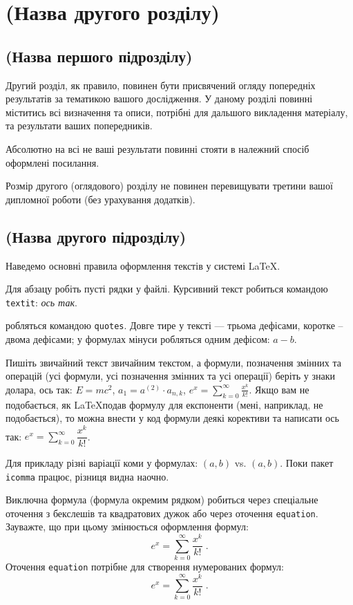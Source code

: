 
\chapter{(Назва другого розділу)}
\label{chap:review}

\section{(Назва першого підрозділу)}

Другий розділ, як правило, повинен бути присвячений огляду попередніх результатів за 
тематикою вашого дослідження. У даному розділі повинні міститись всі 
визначення та описи, потрібні для дальшого викладення матеріалу, та результати 
ваших попередників.

Абсолютно на всі не ваші результати повинні стояти 
в належний спосіб оформлені посилання.

Розмір другого (оглядового) розділу не повинен перевищувати третини вашої 
дипломної роботи (без урахування додатків).


\section{(Назва другого підрозділу)}

Наведемо основні правила оформлення текстів у системі \LaTeX.

Для абзацу робіть пусті рядки у файлі. Курсивний текст робиться командою 
\texttt{textit}: \textit{ось так}. 

 робляться командою \texttt{quotes}. Довге 
тире у тексті --- трьома дефісами, коротке -- двома дефісами; у формулах 
мінуси робляться одним дефісом: $a-b$.

Пишіть звичайний текст звичайним текстом, а формули, позначення змінних та 
операцій (усі формули, усі позначення змінних та усі операції) беріть у 
знаки долара, ось так: $E = mc^2$, $a_1 = a^{(2)} \cdot a_{n, k}$, $e^x = 
\sum_{k = 0}^{\infty} {\frac{x^k}{k!}}$. Якщо вам 
не подобається, як \LaTeX подав формулу для експоненти (мені, наприклад, 
не подобається), то можна внести у код формули деякі корективи та написати ось так: $e^x 
= \sum\limits_{k = 0}^{\infty} {\dfrac{x^k}{k!}}$.

Для прикладу різні варіації коми у формулах: $(a, b)$ vs. $(a,b)$. Поки 
пакет \texttt{icomma} працює, різниця видна наочно.

Виключна формула (формула окремим рядком) робиться через спеціальне оточення з бекслешів та квадратових дужок або через оточення \texttt{equation}. Зауважте, що при цьому змінюється 
оформлення формул:
\[
e^x = \sum_{k = 0}^{\infty} {\frac{x^k}{k!}}\;.
\]
Оточення \texttt{equation} потрібне для створення нумерованих формул:
\begin{equation}
e^x = \sum_{k = 0}^{\infty} {\frac{x^k}{k!}}\;.
\label{eq:exponent}
\end{equation}

